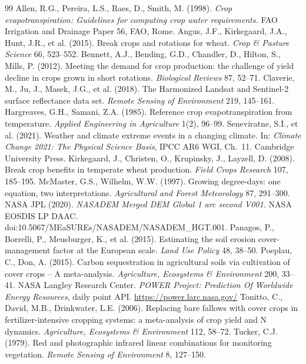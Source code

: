 \documentclass[11pt,a4paper]{article}
\begin{document}
\begin{thebibliography}{99}\small
{} Allen, R.G., Pereira, L.S., Raes, D., Smith, M. (1998). \emph{Crop evapotranspiration: Guidelines for computing crop water requirements.} FAO Irrigation and Drainage Paper 56, FAO, Rome.
 Angus, J.F., Kirkegaard, J.A., Hunt, J.R., et al. (2015). Break crops and rotations for wheat. \emph{Crop \& Pasture Science} 66, 523--552.
 Bennett, A.J., Bending, G.D., Chandler, D., Hilton, S., Mills, P. (2012). Meeting the demand for crop production: the challenge of yield decline in crops grown in short rotations. \emph{Biological Reviews} 87, 52--71.
 Claverie, M., Ju, J., Masek, J.G., et al. (2018). The Harmonized Landsat and Sentinel-2 surface reflectance data set. \emph{Remote Sensing of Environment} 219, 145--161.
 Hargreaves, G.H., Samani, Z.A. (1985). Reference crop evapotranspiration from temperature. \emph{Applied Engineering in Agriculture} 1(2), 96--99.
 Seneviratne, S.I., et al. (2021). Weather and climate extreme events in a changing climate. In: \emph{Climate Change 2021: The Physical Science Basis}, IPCC AR6 WGI, Ch.~11. Cambridge University Press.
 Kirkegaard, J., Christen, O., Krupinsky, J., Layzell, D. (2008). Break crop benefits in temperate wheat production. \emph{Field Crops Research} 107, 185--195.
 McMaster, G.S., Wilhelm, W.W. (1997). Growing degree-days: one equation, two interpretations. \emph{Agricultural and Forest Meteorology} 87, 291--300.
 NASA JPL (2020). \emph{NASADEM Merged DEM Global 1 arc second V001.} NASA EOSDIS LP DAAC. doi:10.5067/MEaSUREs/NASADEM/NASADEM\_HGT.001.
 Panagos, P., Borrelli, P., Meusburger, K., et al. (2015). Estimating the soil erosion cover-management factor at the European scale. \emph{Land Use Policy} 48, 38--50.
 Poeplau, C., Don, A. (2015). Carbon sequestration in agricultural soils via cultivation of cover crops -- A meta-analysis. \emph{Agriculture, Ecosystems \& Environment} 200, 33--41.
 NASA Langley Research Center. \emph{POWER Project: Prediction Of Worldwide Energy Resources}, daily point API. \url{https://power.larc.nasa.gov/}
 Tonitto, C., David, M.B., Drinkwater, L.E. (2006). Replacing bare fallows with cover crops in fertilizer-intensive cropping systems: a meta-analysis of crop yield and N dynamics. \emph{Agriculture, Ecosystems \& Environment} 112, 58--72.
 Tucker, C.J. (1979). Red and photographic infrared linear combinations for monitoring vegetation. \emph{Remote Sensing of Environment} 8, 127--150.

\end{thebibliography}
\end{document}
